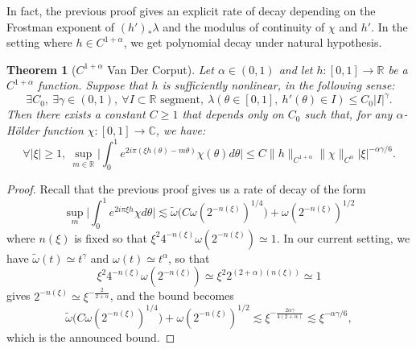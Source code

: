 \documentclass[11pt]{amsart}
\theoremstyle{plain}
\newtheorem{theorem}{Theorem}[section]
\theoremstyle{definition}
\numberwithin{equation}{section}
\begin{document}
In fact, the previous proof gives an explicit rate of decay depending on the Frostman exponent of $(h')_* \lambda$ and the modulus of continuity of $\chi$ and $h'$. In the setting where $h \in C^{1+\alpha}$, we get polynomial decay under natural hypothesis.



\begin{theorem}[$C^{1+\alpha}$ Van Der Corput]\label{thm:c1+alphavandercorput}
Let $\alpha \in (0,1)$ and let $h:[0,1] \rightarrow \mathbb{R}$ be a $C^{1+\alpha}$ function. Suppose that $h$ is sufficiently nonlinear, in the following sense:
$$ \exists C_0, \ \exists \gamma \in (0,1), \ \forall I \subset \mathbb{R} \text{ segment}, \  \lambda( \theta \in [0,1], \ h'(\theta) \in I ) \leq C_0 |I|^\gamma .$$
Then there exists a constant $C \geq 1$ that depends only on $C_0$ such that, for any $\alpha$-Hölder function $\chi:[0,1] \rightarrow \mathbb{C}$, we have:
$$  \forall |\xi| \geq 1, \ \sup_{m \in \mathbb{R}} \Big| \int_{0}^1 e^{2 i \pi (\xi h(\theta) - m \theta)} \chi(\theta) d\theta \Big| \leq C \|h\|_{C^{1+\alpha}}  \|\chi\|_{C^\alpha} |\xi|^{-\alpha \gamma/6}. $$
\end{theorem}

\begin{proof}
Recall that the previous proof gives us a rate of decay of the form
$$ \sup_m \Big| \int_0^1 e^{2 i \pi \xi h} \chi d\theta \Big| \lesssim \tilde{\omega}\Big(C \omega(2^{-n(\xi)})^{1/4} \Big) + \omega(2^{-n(\xi)})^{1/2}$$
where $n(\xi)$ is fixed so that $\xi^2 4^{-n(\xi)} \omega(2^{-n(\xi)}) \simeq 1$.
In our current setting, we have $\tilde{\omega}(t) \simeq t^\gamma$ and $\omega(t) \simeq t^\alpha$, so that
$$ \xi^2 4^{-n(\xi)} \omega(2^{-n(\xi)}) \simeq \xi^{2} 2^{(2+\alpha)(n(\xi))} \simeq 1$$
gives $ 2^{-n(\xi)} \simeq \xi^{-\frac{2}{2+\alpha}} $,
and the bound becomes
$$ \tilde{\omega}\Big(C \omega(2^{-n(\xi)})^{1/4} \Big) + \omega(2^{-n(\xi)})^{1/2} \lesssim \xi^{-\frac{2\alpha \gamma}{4(2+\alpha)}} \lesssim \xi^{- \alpha \gamma/6}, $$
which is the announced bound.
\end{proof}
\end{document}
